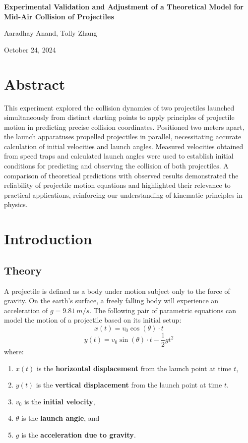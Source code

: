 \documentclass[12pt]{article}
\begin{document}
\begin{titlepage}
    \centering
    \vfill
    \vspace*{2.5in}
    {\Huge\bfseries Experimental Validation and Adjustment of a Theoretical Model for Mid-Air Collision of Projectiles \par}
    \vspace{0.2in}
    {\LARGE Aaradhay Anand, Tolly Zhang\par}
    \vspace{0.2in}
    {\LARGE October 24, 2024 \par}
    \vfill
\end{titlepage}

\newpage

\section{Abstract}
This experiment explored the collision dynamics of two projectiles launched simultaneously from distinct starting points to apply principles of projectile motion in predicting precise collision coordinates. Positioned two meters apart, the launch apparatuses propelled projectiles in parallel, necessitating accurate calculation of initial velocities and launch angles. Measured velocities obtained from speed traps and calculated launch angles were used to establish initial conditions for predicting and observing the collision of both projectiles. A comparison of theoretical predictions with observed results demonstrated the reliability of projectile motion equations and highlighted their relevance to practical applications, reinforcing our understanding of kinematic principles in physics.

\section{Introduction}

\subsection{Theory}

A projectile is defined as a body under motion subject only to the force of gravity. On the earth's surface, a freely falling body will experience an acceleration of $g=9.81 \ m/s$. The following pair of parametric equations can model the motion of a projectile based on its initial setup:
\[
x(t) = v_0 \cos(\theta) \cdot t
\]
\[
y(t) = v_0 \sin(\theta) \cdot t - \frac{1}{2} g t^2
\]
where:
\begin{enumerate}
    \item $x(t)$ is the \textbf{horizontal displacement} from the launch point at time $t$,
    \item $y(t)$ is the \textbf{vertical displacement} from the launch point at time $t$.
    \item $v_0$ is the \textbf{initial velocity},
    \item $\theta$ is the \textbf{launch angle}, and
    \item $g$ is the \textbf{acceleration due to gravity}.
\end{enumerate}
\end{document}
